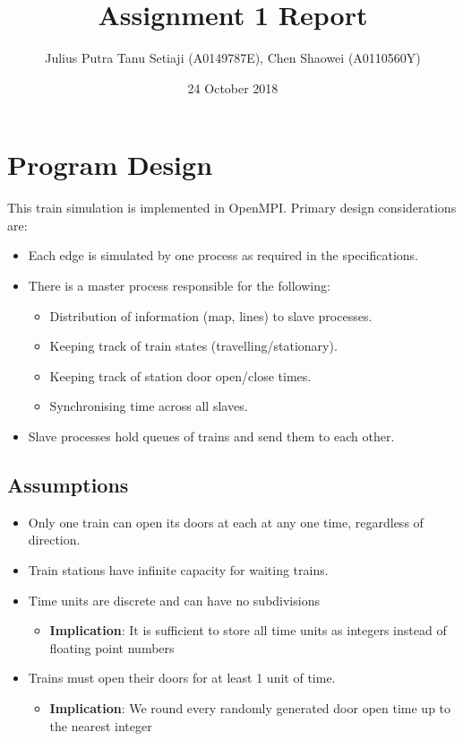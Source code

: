 \documentclass[a4paper,12pt]{article}
\title{Assignment 1 Report}
\author{Julius Putra Tanu Setiaji (A0149787E), Chen Shaowei (A0110560Y)}
\date{24 October 2018}
\begin{document}
\maketitle

\section{Program Design}
This train simulation is implemented in OpenMPI. Primary design considerations are:
\begin{itemize}
  \item Each edge is simulated by one process as required in the specifications.
  \item There is a master process responsible for the following:
    \begin{itemize}
      \item Distribution of information (map, lines) to slave processes.
      \item Keeping track of train states (travelling/stationary).
      \item Keeping track of station door open/close times.
      \item Synchronising time across all slaves.
    \end{itemize}
  \item Slave processes hold queues of trains and send them to each other.
\end{itemize}

\subsection*{Assumptions}

\begin{itemize}
	\item Only one train can open its doors at each at any one time, regardless of direction.
	\item Train stations have infinite capacity for waiting trains.
	\item Time units are discrete and can have no subdivisions
	      \begin{itemize}
		      \item \textbf{Implication}: It is sufficient to store all time units as integers instead of floating point numbers
	      \end{itemize}
	\item Trains must open their doors for at least 1 unit of time.
	      \begin{itemize}
		      \item \textbf{Implication}: We round every randomly generated door open time up to the nearest integer
	      \end{itemize}
\end{itemize}
\end{document}
